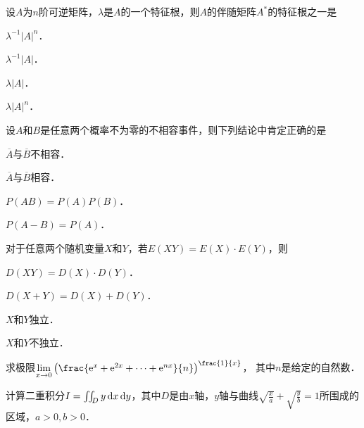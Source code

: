 \documentclass[plain,noanswer,medmath]{../../template/jnuexam}
\begin{document}
\begin{problem}
设$A$为$n$阶可逆矩阵，$\lambda$是$A$的一个特征根，则$A$的伴随矩阵$A^*$的特征根之一是\pickout{}
\begin{abcd}
\item $\lambda^{-1}|A|^n$．
\item $\lambda^{-1}|A|$．
\item $\lambda |A|$．
\item $\lambda |A|^n$．
\end{abcd}
\end{problem}


\begin{problem}
设$A$和$B$是任意两个概率不为零的不相容事件，则下列结论中肯定正确的是 \pickout{}
\begin{abcd}
\item $\overline{A}$与$\overline{B}$不相容．						
\item $\overline{A}$与$\overline{B}$相容．
\item $P(AB) = P(A)P(B)$．
\item $P(A - B) = P(A)$．
\end{abcd}
\end{problem}


\begin{problem}
对于任意两个随机变量$X$和$Y$，若$E(XY) = E(X) \cdot E(Y)$，则\pickout{}
\begin{abcd}
\item $D(XY) = D(X) \cdot D(Y)$．				
\item $D(X + Y) = D(X) + D(Y)$．
\item $X$和$Y$独立．						
\item $X$和$Y$不独立．
\end{abcd}
\end{problem}



\begin{problem}
求极限$\lim_{x \to 0} \left(\frac{\e^x + \e^{2x} + \cdots + \e^{nx}}{n} \right)^{\frac{1}{x}}$，
其中$n$是给定的自然数．
\end{problem}



\begin{problem}
计算二重积分$I = \iint_D y\mathop{}\!\mathrm{d} x\mathop{}\!\mathrm{d} y$，其中$D$是由$x$轴，$y$轴与曲线$\sqrt{\frac{x}{a}} + \sqrt{\frac{y}{b}} = 1$所围成的区域，$a > 0,b > 0$．
\end{problem}


\end{document}
